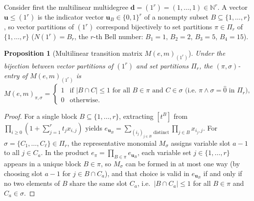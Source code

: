 \documentclass[11pt,a4paper]{article}
\newtheorem{proposition}[theorem]{Proposition}
\theoremstyle{definition}
\theoremstyle{remark}
\newcommand{\NN}{\mathbb{N}}
\newcommand{\vecd}{\mathbf{d}}
\newcommand{\vecu}{\mathbf{u}}
\begin{document}
Consider first the multilinear multidegree $\vecd = (1^r) = (1, \dots, 1) \in \NN^r$. A vector $\vecu \le (1^r)$ is the indicator vector $\vecu_B \in \{0,1\}^r$ of a nonempty subset $B \subseteq \{1,\dots,r\}$, so vector partitions of $(1^r)$ correspond bijectively to set partitions $\pi \in \Pi_r$ of $\{1,\dots,r\}$ ($N(1^r) = B_r$, the $r$-th Bell number: $B_1 = 1$, $B_2 = 2$, $B_3 = 5$, $B_4 = 15$).

\begin{proposition}[Multilinear transition matrix $M(e,m)_{(1^r)}$]\label{prop:multilinear}
Under the bijection between vector partitions of $(1^r)$ and set partitions $\Pi_r$, the $(\pi,\sigma)$-entry of $M(e,m)_{(1^r)}$ is
\[
  M(e,m)_{\pi,\sigma} =
  \begin{cases}
    1 & \text{if } |B \cap C| \le 1 \text{ for all } B \in \pi \text{ and } C \in \sigma \text{ (i.e.\ } \pi \wedge \sigma = \hat{0} \text{ in } \Pi_r\text{)},\\
    0 & \text{otherwise.}
  \end{cases}
\]
\end{proposition}

\begin{proof}
For a single block $B \subseteq \{1,\dots,r\}$, extracting $[t^B]$ from $\prod_{i \ge 0}(1 + \sum_{j=1}^r t_j x_{i,j})$ yields $e_{\vecu_B} = \sum_{(i_j)_{j \in B}\text{ distinct}} \prod_{j \in B} x_{i_j, j}$. For $\sigma = \{C_1, \dots, C_\ell\} \in \Pi_r$, the representative monomial $M_\sigma$ assigns variable slot $a - 1$ to all $j \in C_a$. In the product $e_\pi = \prod_{B \in \pi} e_{\vecu_B}$, each variable set $j \in \{1,\dots,r\}$ appears in a unique block $B \in \pi$, so $M_\sigma$ can be formed in at most one way (by choosing slot $a - 1$ for $j \in B \cap C_a$), and that choice is valid in $e_{\vecu_B}$ if and only if no two elements of $B$ share the same slot $C_a$, i.e.\ $|B \cap C_a| \le 1$ for all $B \in \pi$ and $C_a \in \sigma$.
\end{proof}
\end{document}
